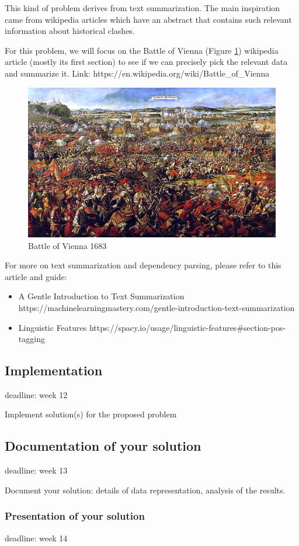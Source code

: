\documentclass[a4paper,10pt]{article}
\begin{document}
 
  This kind of problem derives from text summarization. The main inspiration came from wikipedia articles which have an abstract that contains such relevant information about historical clashes. \newline
  
  For this problem, we will focus on the Battle of Vienna (Figure \ref{fig:battle}) wikipedia article (mostly its first section) to see if we can precisely pick the relevant data and summarize it. \newline
  Link: https://en.wikipedia.org/wiki/Battle\_of\_Vienna\newline
 
  \begin{figure}
  \centering
  \includegraphics[width=1.0\textwidth]{cover2.jpg}
  \caption{Battle of Vienna 1683}
  \label{fig:battle}
 \end{figure}
 
  For more on text summarization and dependency parsing, please refer to this article and guide:
  \begin{itemize}
      \item A Gentle Introduction to Text Summarization \newline https://machinelearningmastery.com/gentle-introduction-text-summarization
      \item Linguistic Features \newline https://spacy.io/usage/linguistic-features#section-pos-tagging
  \end{itemize}
  
  
  \subsection{Implementation} 
  deadline:  week  12
  
 Implement solution(s) for the proposed problem

  \subsection{Documentation of your solution}
  deadline: week 13
  
  Document your solution: details of data representation, analysis of the results.
  
  \subsubsection{Presentation of your solution}
deadline: week 14
\end{document}
